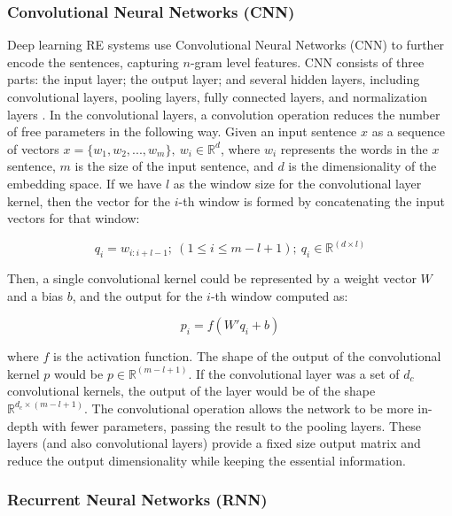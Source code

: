 \subsubsection{Convolutional Neural Networks (CNN)}

Deep learning RE systems use Convolutional Neural Networks (CNN) to further encode the sentences, capturing $n$-gram level features. CNN consists of three parts: the input layer; the output layer; and several hidden layers, including convolutional layers, pooling layers, fully connected layers, and normalization layers \citep{xue2018relation}. 
In the convolutional layers, a convolution operation reduces the number of free parameters in the following way. Given an input sentence $x$ as a sequence of vectors $x = \{w_1,w_2,...,w_m\},\ w_i \in \mathbb{R}^d$, where $w_i$ represents the words in the $x$ sentence,  $m$ is the size of the input sentence, and $d$ is the dimensionality of the embedding space. If we have $l$ as the window size for the convolutional layer kernel, then the vector for the $i$-th window is formed by concatenating the input vectors for that window:

\begin{equation}
    q_i = w_{i:i+l-1};\ (1 \leq i \leq m-l+1);\ q_i \in \mathbb{R}^{(d \times l)}
\end{equation}

Then, a single convolutional kernel could be represented by a weight vector $W$ and a bias $b$, and the output for the $i$-th window computed as:

\begin{equation}
    p_i= f (W'q_i+b)
\end{equation}

where $f$ is the activation function. The shape of the output of the convolutional kernel $p$ would be $p \in \mathbb{R} ^{(m-l+1)}$. If the convolutional layer was a set of $d_c$ convolutional kernels, the output of the layer would be of the shape $\mathbb{R} ^{d_c \times (m-l+1)}$.
The convolutional operation allows the network to be more in-depth with fewer parameters, passing the result to the pooling layers. These layers (and also convolutional layers) provide a fixed size output matrix and reduce the output dimensionality while keeping the essential information. 

\hypertarget{2.1.4.2}{\subsubsection{Recurrent Neural Networks (RNN)}}

